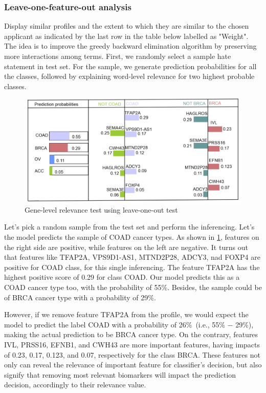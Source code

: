 \subsubsection{Leave-one-feature-out analysis}
Display similar profiles and the extent to which they are similar to the chosen applicant as indicated by the last row in the table below labelled as "Weight". The idea is to improve the greedy backward elimination algorithm by preserving more interactions among terms. First, we randomly select a sample hate statement in test set. For the sample, we generate prediction probabilities for all the classes, followed by explaining word-level relevance for two highest probable classes. 

\begin{figure}[h]
    \vspace{-2mm}
	\centering
	\includegraphics[scale=0.6]{images/reli_explain.png}
	\caption{Gene-level relevance test using leave-one-out test}
    \label{fig:explain_term_wise_religious_hate}
	\vspace{-4mm}
\end{figure}

\hspace*{3.5mm} Let's pick a random sample from the test set and perform the inferencing. Let's the model predicts the sample of COAD cancer types. As shown in \cref{fig:explain_term_wise_religious_hate}, features on the right side are positive, while features on the left are negative. It turns out that features like TFAP2A,  VPS9D1-AS1, MTND2P28, ADCY3, nad FOXP4 are positive for COAD class, for this single inferencing. The feature TFAP2A has the highest positive score of 0.29 for class COAD. Our model predicts this as a COAD cancer type too, with the probability of 55\%. Besides, the sample could be of BRCA cancer type with a probability of 29\%.  

\hspace*{3.5mm} However, if we remove feature TFAP2A from the profile, we would expect the model to predict the label COAD with a probability of 26\%~(i.e., 55\% $-$ 29\%), making the actual prediction to be BRCA cancer type. On the contrary, features IVL, PRSS16, EFNB1, and CWH43 are more important features, having impacts of 0.23, 0.17, 0.123, and 0.07, respectively for the class BRCA. These features not only can reveal the relevance of important feature for classifier’s decision, but also signify that removing most relevant biomarkers will impact the prediction decision, accordingly to their relevance value. 

